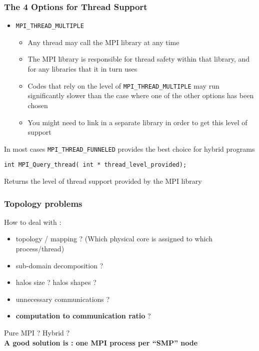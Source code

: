 \begin{frame}[fragile]
\frametitle{The 4 Options for Thread Support}

\begin{itemize}
\item \verb+MPI_THREAD_MULTIPLE+
\begin{itemize}
\item Any thread may call the MPI library at any time
\item The MPI library is responsible  for thread safety within that library, and for any libraries that  it in turn uses
\item Codes that rely on the level of \verb+MPI_THREAD_MULTIPLE+ may run significantly slower than the  case where one of the other options has been chosen
\item You might need to link in a separate library in order to get this level of support
\end{itemize}
\end{itemize}


    In  most    cases   \verb+MPI_THREAD_FUNNELED+      provides        the     best    choice  for     hybrid  programs

\begin{Verbatim}[formatcom=\color{blue}]
int MPI_Query_thread( int * thread_level_provided);
\end{Verbatim}

Returns the level of thread support provided by the MPI library

\end{frame}



\begin{frame}
\frametitle{Topology problems}

%

How to deal with :

\begin{itemize}
\item topology / mapping ? (Which physical core is assigned to which process/thread)
\item sub-domain decomposition ?
\item halos size ? halos shapes ?
\item unnecessary communications ?
\item \textbf{computation to communication ratio} ?
\end{itemize}

Pure MPI ? Hybrid ?
\\
\textbf{A good solution is : one MPI process per ``SMP'' node}

\end{frame}



